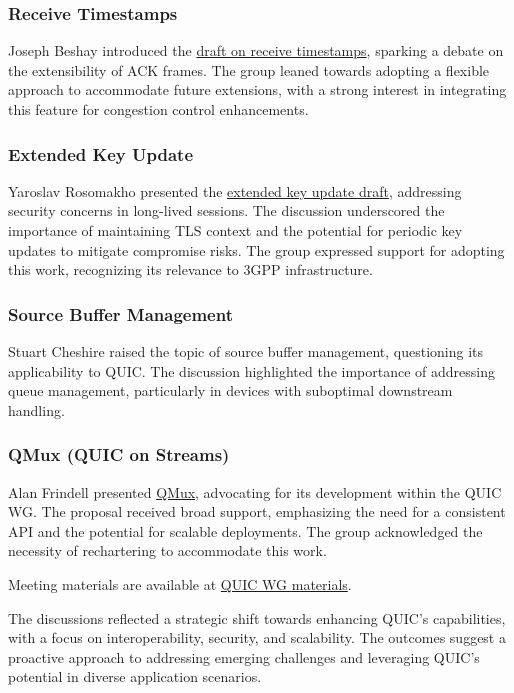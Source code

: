 \documentclass{article}
\begin{document}
\subsubsection{Receive Timestamps}
Joseph Beshay introduced the \href{https://datatracker.ietf.org/doc/draft-smith-quic-receive-ts/}{draft on receive timestamps}, sparking a debate on the extensibility of ACK frames. The group leaned towards adopting a flexible approach to accommodate future extensions, with a strong interest in integrating this feature for congestion control enhancements.

\subsubsection{Extended Key Update}
Yaroslav Rosomakho presented the \href{https://datatracker.ietf.org/doc/draft-rosomakho-quic-extended-key-update/}{extended key update draft}, addressing security concerns in long-lived sessions. The discussion underscored the importance of maintaining TLS context and the potential for periodic key updates to mitigate compromise risks. The group expressed support for adopting this work, recognizing its relevance to 3GPP infrastructure.

\subsubsection{Source Buffer Management}
Stuart Cheshire raised the topic of source buffer management, questioning its applicability to QUIC. The discussion highlighted the importance of addressing queue management, particularly in devices with suboptimal downstream handling.

\subsubsection{QMux (QUIC on Streams)}
Alan Frindell presented \href{https://datatracker.ietf.org/doc/draft-kazuho-quic-quic-on-streams/}{QMux}, advocating for its development within the QUIC WG. The proposal received broad support, emphasizing the need for a consistent API and the potential for scalable deployments. The group acknowledged the necessity of rechartering to accommodate this work.

Meeting materials are available at \href{https://github.com/quicwg/wg-materials/blob/main/ietf122/}{QUIC WG materials}.

The discussions reflected a strategic shift towards enhancing QUIC's capabilities, with a focus on interoperability, security, and scalability. The outcomes suggest a proactive approach to addressing emerging challenges and leveraging QUIC's potential in diverse application scenarios.
\end{document}

